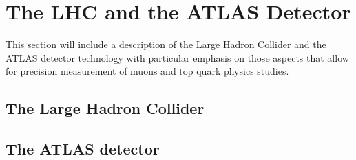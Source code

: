 
\chapter{The LHC and the ATLAS Detector} \label{sec:lhc_atlas_detector}
This section will include a description of the Large Hadron Collider and the ATLAS detector
technology with particular emphasis on those aspects that allow for precision measurement
of muons and top quark physics studies.

\section{The Large Hadron Collider} \label{sec:the_large_hadron_collider}
\section{The ATLAS detector} \label{sec:the_atlas_detector}
